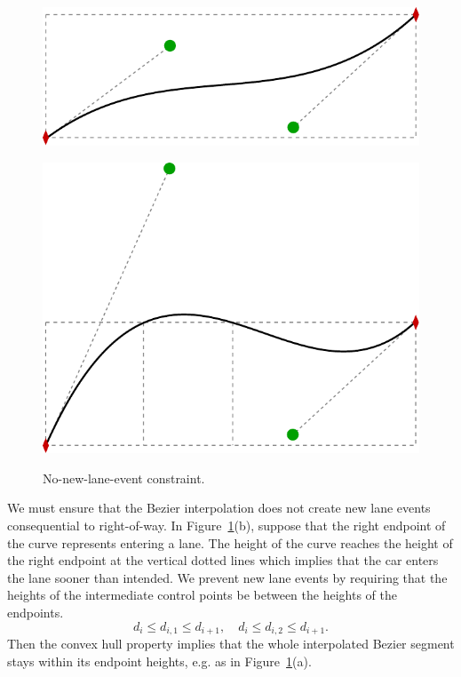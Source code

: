 \begin{figure}%
  \centering
  \begin{minipage}[t]{.495\linewidth}
    {\includegraphics[width=\linewidth]{figures/chapter4/bezier-monotonic.pdf}}%
  \end{minipage}%
  \hfill
  \begin{minipage}[t]{.495\linewidth}
    {\includegraphics[width=\linewidth]{figures/chapter4/bezier-nonmonotonic.pdf}}%
  \end{minipage}%
  \caption{No-new-lane-event constraint.}\label{fig:bezier}%
\end{figure}%

We must ensure that the Bezier interpolation does not create new lane events consequential to right-of-way.
%
In Figure~\ref{fig:bezier}(b), suppose that the right endpoint of the curve represents entering a lane.
%
The height of the curve reaches the height of the right endpoint at the vertical dotted lines which implies that the car enters the lane sooner than intended.
%
We prevent new lane events by requiring that the heights of the intermediate control points be between the heights of the endpoints.
%
$$ d_i \leq d_{i,1} \leq d_{i+1}, \quad d_i \leq d_{i,2} \leq d_{i+1}.
$$
%
Then the convex hull property implies that the whole interpolated Bezier segment stays within its endpoint heights, e.g. as in Figure~\ref{fig:bezier}(a).





